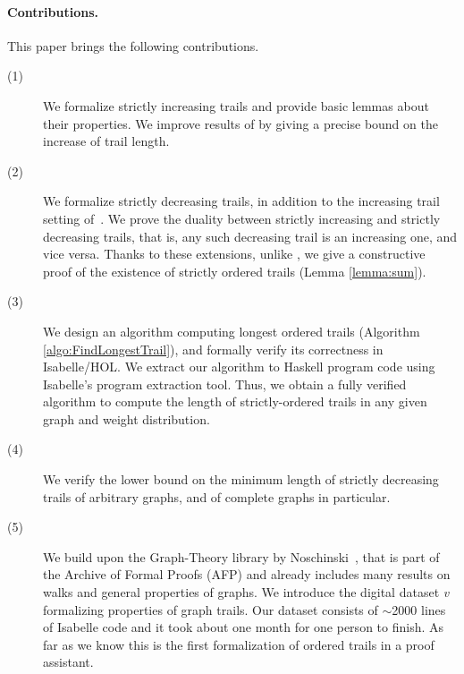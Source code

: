\begin{isabellebody}
\begin{isamarkuptext}
\noindent\paragraph{\bf Contributions.} This paper brings the following contributions.
\begin{description}
\item[(1)]
We formalize strictly increasing trails and provide basic lemmas about their
properties. We improve results of \cite{graham1973increasing} by giving a precise bound on the increase of trail length.
\item[(2)] We formalize strictly decreasing trails, in addition to the increasing trail setting of~\cite{graham1973increasing}. 
We prove the duality between strictly increasing and strictly decreasing trails, that is, any such decreasing trail is an increasing one, and vice versa. 
Thanks to these extensions, unlike \cite{graham1973increasing},  we give a constructive proof of the existence of strictly ordered trails (Lemma \ref{lemma:sum}). 
\item[(3)] We design an algorithm computing longest ordered trails (Algorithm \ref{algo:FindLongestTrail}), and formally verify  its correctness in Isabelle/HOL.
We extract our algorithm to Haskell program code using Isabelle's program extraction tool. Thus, we obtain a fully verified algorithm to compute the length
of strictly-ordered trails in any given graph and weight distribution.
\item[(4)] We
verify the lower bound on
the minimum length of strictly decreasing trails of arbitrary graphs, and of complete graphs in particular.
\item[(5)] We build upon the Graph-Theory library by Noschinski~\cite{Graph_Theory-AFP},  that is part of the
Archive of Formal Proofs (AFP) and already includes many results on walks and
general properties of graphs. We introduce the digital dataset {\it v} formalizing properties of graph trails. Our dataset  consists of
$\sim$2000 lines of Isabelle code and it took about one month for one person to finish. As far as we know this is the first formalization of
ordered trails in a proof assistant.
\end{description}


\end{isamarkuptext}
\end{isabellebody}
